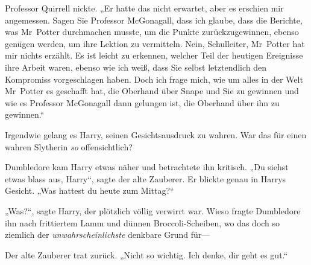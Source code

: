 Professor Quirrell nickte. „Er hatte das nicht erwartet, aber es erschien mir angemessen. Sagen Sie Professor McGonagall, dass ich glaube, dass die Berichte, was Mr~Potter durchmachen musste, um die Punkte zurückzugewinnen, ebenso genügen werden, um ihre Lektion zu vermitteln. Nein, Schulleiter, Mr~Potter hat mir nichts erzählt. Es ist leicht zu erkennen, welcher Teil der heutigen Ereignisse ihre Arbeit waren, ebenso wie ich weiß, dass Sie selbst letztendlich den Kompromiss vorgeschlagen haben. Doch ich frage mich, wie um alles in der Welt Mr~Potter es geschafft hat, die Oberhand über Snape und Sie zu gewinnen und wie es Professor McGonagall dann gelungen ist, die Oberhand über ihn zu gewinnen.“

Irgendwie gelang es Harry, seinen Gesichtsausdruck zu wahren. War das für einen wahren Slytherin \emph{so} offensichtlich?

Dumbledore kam Harry etwas näher und betrachtete ihn kritisch. „Du siehst etwas blass aus, Harry“, sagte der alte Zauberer. Er blickte genau in Harrys Gesicht. „Was hattest du heute zum Mittag?“

„Was?“, sagte Harry, der plötzlich völlig verwirrt war. Wieso fragte Dumbledore ihn nach frittiertem Lamm und dünnen Broccoli-Scheiben, wo das doch so ziemlich der \emph{unwahrscheinlichste} denkbare Grund für—

Der alte Zauberer trat zurück. „Nicht so wichtig. Ich denke, dir geht es gut.“

